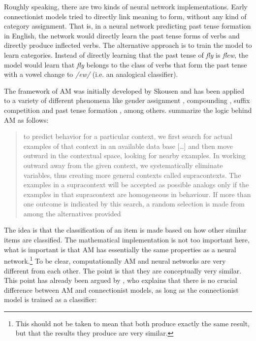 Roughly speaking, there are two kinds of neural network implementations. Early connectionist models tried to directly link meaning to form, without any kind of category assignment. That is, in a neural network predicting past tense formation in English, the network would directly learn the past tense forms of verbs and directly produce inflected verbs.
The alternative approach is to train the model to learn categories. Instead of directly learning that the past tense of \textit{fly} is \textit{flew}, the model would learn that \textit{fly} belongs to the class of verbs that form the past tense with a vowel change to \textit{/ew/} (i.e. an analogical classifier).

The framework of AM was initially developed by Skousen \autocites{Skousen.1989, Skousen.2002, Skousen.2013} and has been applied to a variety of different phenomena like gender assignment \autocites{Eddington.2002, Eddington.2004}, compounding \autocite{Arndt-Lappe.2011}, suffix competition \autocite{Arndt-Lappe.2014} and past tense formation \autocite{Derwing.1994}, among others. \textcite[193]{Derwing.1994} summarize the logic behind AM as follows:

\begin{quotation}
to predict behavior for a particular context, we first search for actual examples of that context in an available data base [\dots] and then move outward in the contextual space, looking for nearby examples. In working outward away from the given context, we systematically eliminate variables, thus creating more general contexts called supracontexts. The examples in a supracontext will be accepted as possible analogs only if the examples in that supracontext are homogeneous in behaviour. If more than one outcome is indicated by this search, a random selection is made from among the alternatives provided
\autocite[193]{Derwing.1994}
\end{quotation}

The idea is that the classification of an item is made based on how other similar items are classified. The mathematical implementation is not too important here, what is important is that AM has essentially the same properties as a neural network.\footnote{This should not be taken to mean that both produce exactly the same result, but that the results they produce are very similar.} To be clear, computationally AM and neural networks are very different from each other. The point is that they are conceptually very similar. This point has already been argued by \textcite[289]{Matthews.2005}, who explains that there is no crucial difference between AM and connectionist models, as long as the connectionist model is trained as a classifier:

